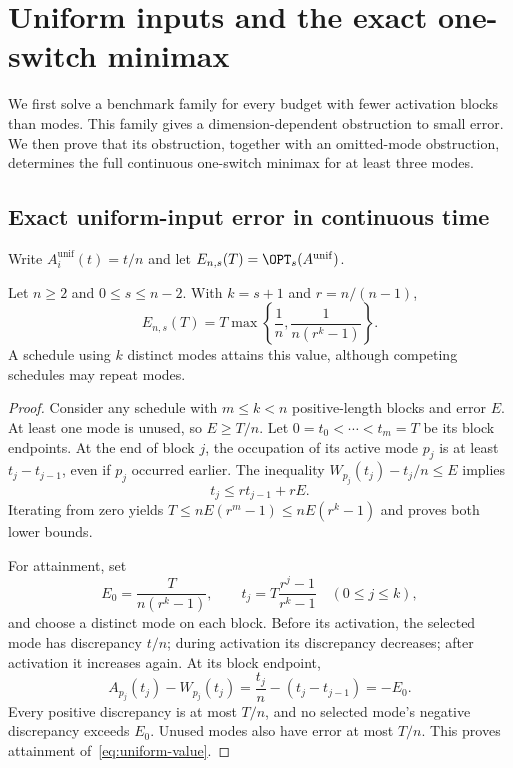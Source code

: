 \section{Uniform inputs and the exact one-switch minimax}\label{sec:one-switch}

We first solve a benchmark family for every budget with fewer activation
blocks than modes. This family gives a dimension-dependent obstruction to
small error. We then prove that its obstruction, together with an omitted-mode
obstruction, determines the full continuous one-switch minimax for at least
three modes.

\subsection{Exact uniform-input error in continuous time}

Write $A^{\mathrm{unif}}_i(t)=t/n$ and let
$E_{n,s}(T)=\OPT_s(A^{\mathrm{unif}})$.

\begin{theorem}\label{thm:uniform}
Let $n\ge2$ and $0\le s\le n-2$. With $k=s+1$ and $r=n/(n-1)$,
\begin{equation}\label{eq:uniform-value}
 E_{n,s}(T)=T\max\left\{\frac1n,\frac{1}{n(r^k-1)}\right\}.
\end{equation}
A schedule using $k$ distinct modes attains this value, although competing
schedules may repeat modes.
\end{theorem}
\begin{proof}
Consider any schedule with $m\le k<n$ positive-length blocks and error $E$.
At least one mode is unused, so $E\ge T/n$. Let $0=t_0<\cdots<t_m=T$
be its block endpoints. At the end of block $j$, the occupation of its active
mode $p_j$ is at least $t_j-t_{j-1}$, even if $p_j$ occurred earlier.
The inequality $W_{p_j}(t_j)-t_j/n\le E$ implies
\begin{equation}\label{eq:uniform-reach}
 t_j\le r t_{j-1}+rE.
\end{equation}
Iterating from zero yields
$T\le nE(r^m-1)\le nE(r^k-1)$ and proves both lower bounds.

For attainment, set
\[
 E_0=\frac{T}{n(r^k-1)},\qquad
 t_j=T\frac{r^j-1}{r^k-1}\quad(0\le j\le k),
\]
and choose a distinct mode on each block. Before its activation, the
selected mode has discrepancy $t/n$; during activation its discrepancy
decreases; after activation it increases again. At its block endpoint,
\[
 A_{p_j}(t_j)-W_{p_j}(t_j)
 =\frac{t_j}{n}-(t_j-t_{j-1})=-E_0.
\]
Every positive discrepancy is at most $T/n$, and no selected mode's
negative discrepancy exceeds $E_0$. Unused modes also have error at most
$T/n$. This proves attainment of~\eqref{eq:uniform-value}.
\end{proof}

